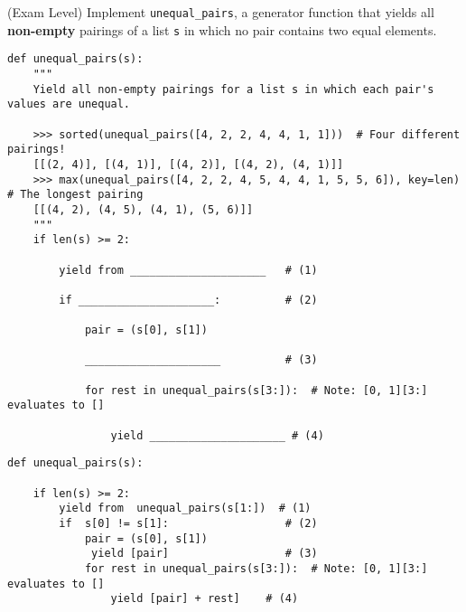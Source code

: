 \begin{blocksection}
\question(Exam Level) Implement \texttt{unequal\_pairs}, a generator function that yields all \textbf{non-empty} pairings of a list \texttt{s} in which no pair contains two equal elements.

\begin{lstlisting}
def unequal_pairs(s):
    """
    Yield all non-empty pairings for a list s in which each pair's values are unequal.

    >>> sorted(unequal_pairs([4, 2, 2, 4, 4, 1, 1]))  # Four different pairings!
    [[(2, 4)], [(4, 1)], [(4, 2)], [(4, 2), (4, 1)]]
    >>> max(unequal_pairs([4, 2, 2, 4, 5, 4, 4, 1, 5, 5, 6]), key=len)  # The longest pairing
    [[(4, 2), (4, 5), (4, 1), (5, 6)]]
    """
    if len(s) >= 2:

        yield from _____________________   # (1)

        if _____________________:          # (2)

            pair = (s[0], s[1])

            _____________________          # (3)

            for rest in unequal_pairs(s[3:]):  # Note: [0, 1][3:] evaluates to []

                yield _____________________ # (4)
\end{lstlisting}

\end{blocksection}

\begin{blocksection}
\begin{solution}[0in]

\begin{lstlisting}
def unequal_pairs(s):
 
    if len(s) >= 2:
        yield from  unequal_pairs(s[1:])  # (1)
        if  s[0] != s[1]:                  # (2)
            pair = (s[0], s[1])
             yield [pair]                  # (3)
            for rest in unequal_pairs(s[3:]):  # Note: [0, 1][3:] evaluates to []
                yield [pair] + rest]    # (4)
\end{lstlisting}

\end{solution}
\end{blocksection}